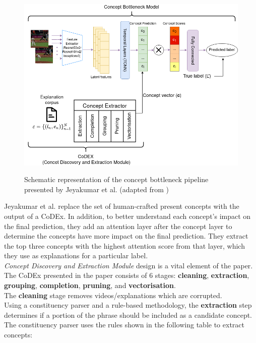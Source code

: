 \begin{figure}[h]
\caption{Schematic representation of the concept bottleneck pipeline presented by Jeyakumar et al. (adapted from \cite{RefWorks:RefID:16-2021automatic})} 
\vspace{5pt}
\centering
\includegraphics[width=\textwidth]{concept-bottleneck-pipeline/vikranth-concept-bottleneck.png}
\label{vikranth-concept-bottleneck}
\end{figure}


Jeyakumar et al. replace the set of human-crafted present concepts with the output of a CoDEx. 
In addition, to better understand each concept's impact on the final prediction, they add an attention layer after the concept layer to determine the concepts have more impact on the final prediction.
They extract the top three concepts with the highest attention score from that layer, which they use as explanations for a particular label. \\

\emph{Concept Discovery and Extraction Module} design is a vital element of the paper.
The CoDEx presented in the paper consists of 6 stages: \textbf{cleaning}, \textbf{extraction}, \textbf{grouping}, \textbf{completion}, \textbf{pruning}, and \textbf{vectorisation}. \\
The \textbf{cleaning} stage removes videos/explanations which are corrupted. \\
Using a constituency parser and a rule-based methodology, the \textbf{extraction} step determines if a portion of the phrase should be included as a candidate concept. 
The constituency parser uses the rules shown in the following table to extract concepts:

